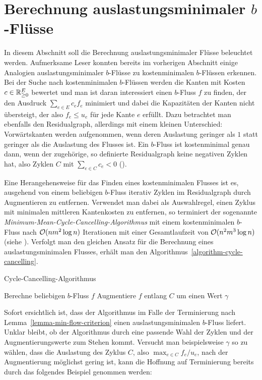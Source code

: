 \section{Berechnung auslastungsminimaler $b$-Flüsse}

In diesem Abschnitt soll die Berechnung auslastungsminimaler Flüsse beleuchtet werden.
Aufmerksame Leser konnten bereits im vorherigen Abschnitt einige Analogien auslastungsminimaler $b$-Flüsse zu kostenminimalen $b$-Flüssen erkennen.
Bei der Suche nach kostenminimalen $b$-Flüssen werden die Kanten mit Kosten $c\in\mathbb{R}_{\geq 0}^E$ bewertet und man ist daran interessiert einen $b$-Fluss $f$ zu finden, der den Ausdruck $\sum_{e \in E} c_e f_e$ minimiert und dabei die Kapazitäten der Kanten nicht übersteigt, der also $f_e \leq u_e$ für jede Kante $e$ erfüllt.
Dazu betrachtet man ebenfalls den Residualgraph, allerdings mit einem kleinen Unterschied: Vorwärtskanten werden aufgenommen, wenn deren Auslastung geringer als $1$ statt geringer als die Auslastung des Flusses ist.
Ein $b$-Fluss ist kostenminimal genau dann, wenn der zugehörige, so definierte Residualgraph keine negativen Zyklen hat, also Zyklen $C$ mit $\sum_{e\in C} c_e < 0$ ().

Eine Herangehensweise für das Finden eines kostenminimalen Flusses ist es, ausgehend von einem beliebigen $b$-Fluss iterativ Zyklen im Residualgraph durch Augmentieren zu entfernen.
Verwendet man dabei als Auswahlregel, einen Zyklus mit minimalen mittleren Kantenkosten zu entfernen, so terminiert der sogenannte \emph{Minimum-Mean-Cycle-Cancelling-Algorithmus} mit einem kostenminimalen $b$-Fluss nach $\mathcal{O}(nm^2\log n)$ Iterationen mit einer Gesamtlaufzeit von $\mathcal{O}(n^2m^3 \log n)$ (siehe \cite[Theoreme~3.9, 3.10]{Goldberg1989}).
Verfolgt man den gleichen Ansatz für die Berechnung eines auslastungsminimalen Flusses, erhält man den Algorithmus~\ref{algorithm-cycle-cancelling}.
\begin{algorithm}
	\caption{Cycle-Cancelling-Algorithmus}
	\label{algorithm-cycle-cancelling}
	\begin{algorithmic}[1]
		\State Berechne beliebigen $b$-Fluss $f$
			\State Augmentiere $f$ entlang $C$ um einen Wert $\gamma$
		\EndWhile
		\EndProcedure
	\end{algorithmic}
\end{algorithm}

Sofort ersichtlich ist, dass der Algorithmus im Falle der Terminierung nach Lemma~\ref{lemma-min-flow-criterion} einen auslastungsminimalen $b$-Fluss liefert.
Unklar bleibt, ob der Algorithmus durch eine passende Wahl der Zyklen und der Augmentierungswerte zum Stehen kommt.
Versucht man beispielsweise $\gamma$ so zu wählen, dass die Auslastung des Zyklus $C$, also $\max_{e\in C} f_e / u_e$, nach der Augmentierung möglichst gering ist, kann die Hoffnung auf Terminierung bereits durch das folgendes Beispiel genommen werden:

